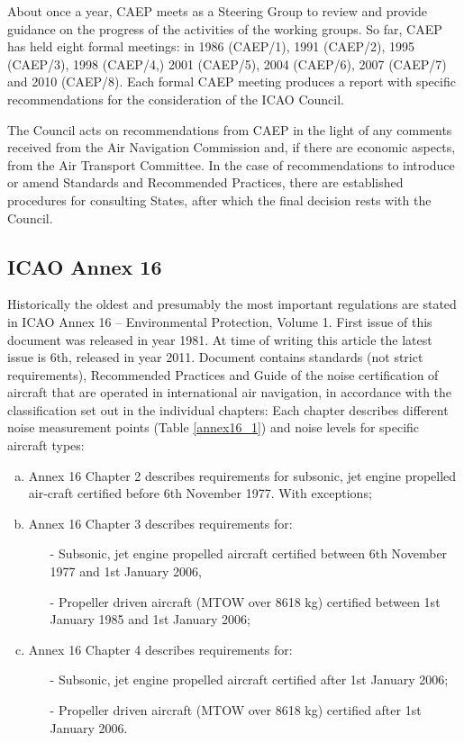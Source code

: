 About once a year, CAEP meets as a Steering Group to review and provide guidance on the progress of the activities of the working groups. So far, CAEP has held eight formal meetings: in 1986 (CAEP/1), 1991 (CAEP/2), 1995 (CAEP/3), 1998 (CAEP/4,) 2001 (CAEP/5), 2004 (CAEP/6), 2007 (CAEP/7) and 2010 (CAEP/8). Each formal CAEP meeting produces a report with specific recommendations for the consideration of the ICAO Council. 

The Council acts on recommendations from CAEP in the light of any comments received from the Air Navigation Commission and, if there are economic aspects, from the Air Transport Committee. In the case of recommendations to introduce or amend Standards and Recommended Practices, there are established procedures for consulting States, after which the final decision rests with the Council.


\subsection{ICAO Annex 16}
Historically the oldest and presumably the most important regulations are stated in ICAO Annex 16 – Environmental Protection, Volume 1. First issue of this document was released in year 1981. At time of writing this article the latest issue is 6th, released in year 2011. Document contains standards (not strict requirements), Recommended Practices and Guide of the noise certification of aircraft that are operated in international air navigation, in accordance with the classification set out in the individual chapters: Each chapter describes different noise measurement points (Table \ref{annex16_1}) and noise levels for specific aircraft types:

\begin{enumerate}[a)]
\item Annex 16 Chapter 2 describes requirements for subsonic, jet engine propelled air-craft certified before 6th November 1977. With exceptions;
\item Annex 16 Chapter 3 describes requirements for:
\begin{itemize}
\item[-] Subsonic, jet engine propelled aircraft certified between 6th November 1977 and 1st January 2006,
\item[-] Propeller driven aircraft (MTOW over 8618 kg) certified between 1st January 1985 and 1st January 2006;
\end{itemize}
\item Annex 16 Chapter 4 describes requirements for:
\begin{itemize}
\item[-] Subsonic, jet engine propelled aircraft certified after 1st January 2006;
\item[-] Propeller driven aircraft (MTOW over 8618 kg) certified after 1st January 2006.
\end{itemize}
\end{enumerate}

